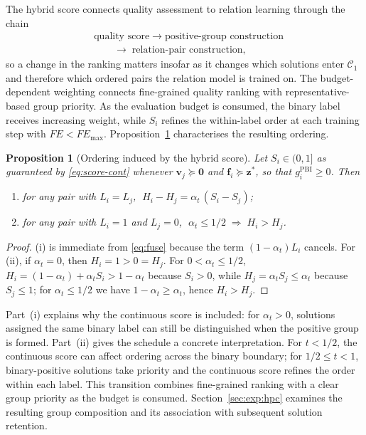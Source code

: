 \documentclass[final,5p,times,twocolumn]{elsarticle}
\newtheorem{proposition}{Proposition}
\newcommand{\vf}{\mathbf{f}}
\newcommand{\vv}{\mathbf{v}}
\newcommand{\vz}{\mathbf{z}}
\begin{document}
The hybrid score connects quality assessment to relation learning through the
chain
\begin{equation*}
\begin{aligned}
&\text{quality score}\;\rightarrow\;\text{positive-group construction}\\
&\qquad\rightarrow\;\text{relation-pair construction},
\end{aligned}
\end{equation*}
so a change in the ranking matters insofar as it changes
which solutions enter $\mathcal{C}_1$ and therefore which ordered pairs the
relation model is trained on. The budget-dependent weighting connects
fine-grained quality ranking with representative-based group priority. As the
evaluation budget is consumed, the binary label receives increasing weight,
while $S_i$ refines the within-label order at each training step with $FE<FE_{\max}$.
Proposition~\ref{prop:order} characterises the resulting ordering.

\begin{proposition}[Ordering induced by the hybrid score]
\label{prop:order}
Let $S_i\in(0,1]$ as guaranteed by \eqref{eq:score-cont} whenever
$\vv_j\succeq\bm{0}$ and $\vf_i\succeq\vz^{*}$, so that
$g_i^{\mathrm{PBI}}\geq0$. Then
\begin{enumerate}[label=(\roman*),leftmargin=*,itemsep=1pt]
\item for any pair with $L_i=L_j$,
      $\;H_i-H_j=\alpha_t\,(S_i-S_j)$;
\item for any pair with $L_i=1$ and $L_j=0$,
      $\;\alpha_t\leq1/2\;\Rightarrow\;H_i>H_j$.
\end{enumerate}
\end{proposition}

\begin{proof}
(i) is immediate from \eqref{eq:fuse} because the term $(1-\alpha_t)L_i$
cancels. For (ii), if $\alpha_t=0$, then $H_i=1>0=H_j$.
For $0<\alpha_t\leq1/2$, $H_i=(1-\alpha_t)+\alpha_tS_i>1-\alpha_t$ because $S_i>0$,
while $H_j=\alpha_tS_j\leq\alpha_t$ because $S_j\leq1$; for
$\alpha_t\leq1/2$ we have $1-\alpha_t\geq\alpha_t$, hence $H_i>H_j$.
\end{proof}

Part~(i) explains why the continuous score is included: for $\alpha_t>0$,
solutions assigned the same binary label can still be distinguished when the
positive group is formed. Part~(ii) gives the schedule a concrete interpretation.
For $t<1/2$, the continuous score can affect ordering across the binary boundary;
for $1/2\leq t<1$, binary-positive solutions take priority and the continuous
score refines the order within each label. This transition combines fine-grained
ranking with a clear group priority as the budget is consumed.
Section~\ref{sec:exp:hpc} examines the resulting group composition and its
association with subsequent solution retention.
\end{document}
